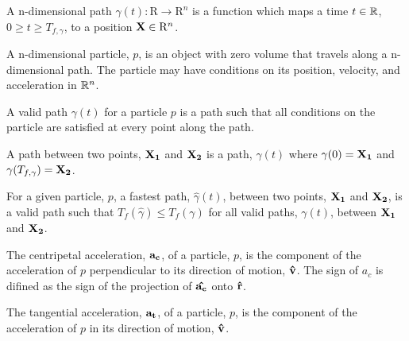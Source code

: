 \begin{definition}
A n-dimensional path $\gamma(t): \mathrm{R} \to \mathrm{R}^n$ is a function which maps a time $t \in \mathbb R$, $0 \ge t \ge T_{f, \gamma}$, to a position $\mathbf{X} \in \mathrm{R}^n$. 
\end{definition}

\begin{definition}
  A n-dimensional particle, $p$, is an object with zero volume that travels along a n-dimensional path. The particle may have conditions on its position, velocity, and acceleration in $\mathbb R^n$.
\end{definition}

\begin{definition}
  A valid path $\gamma(t)$ for a particle $p$ is a path such that all conditions on the particle are satisfied at every point along the path.
\end{definition}

\begin{definition}
  A path between two points, $\mathbf{X_1}$ and $\mathbf{X_2}$ is a path, $\gamma(t)$ where $\gamma(0) = \mathbf{X_1}$ and $\gamma(T_{f, \gamma}) = \mathbf{X_2}$.
\end{definition}

\begin{definition}
  For a given particle, $p$, a fastest path, $\hat{\gamma}(t)$, between two points, $\mathbf{X_1}$ and $\mathbf{X_2}$, is a valid path such that $T_f(\hat{\gamma}) \leq T_f(\gamma)$ for all valid paths, $\gamma(t)$, between $\mathbf{X_1}$ and $\mathbf{X_2}$.
\end{definition}

\begin{definition}
  The centripetal acceleration, $\mathbf{a_c}$, of a particle, $p$, is the component of the acceleration of $p$ perpendicular to its direction of motion, $\mathbf{\hat{v}}$. The sign of $a_c$ is difined as the sign of the projection of $\mathbf{\hat{a_c}}$ onto $\mathbf{\hat{r}}$.
\end{definition}

\begin{definition}
  The tangential acceleration, $\mathbf{a_t}$, of a particle, $p$, is the component of the acceleration of $p$ in its direction of motion, $\mathbf{\hat{v}}$.
\end{definition}